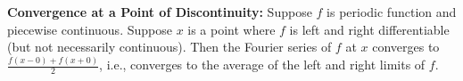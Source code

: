 {\bf Convergence at a Point of Discontinuity:} Suppose $f$ is periodic function and piecewise continuous. Suppose $x$ is a point where $f$ is left and right differentiable (but not necessarily continuous). Then the Fourier series of $f$ at $x$ converges to $\frac{f(x-0)+f(x+0)}{2}$, i.e., converges to the average of the left and right limits of $f$.